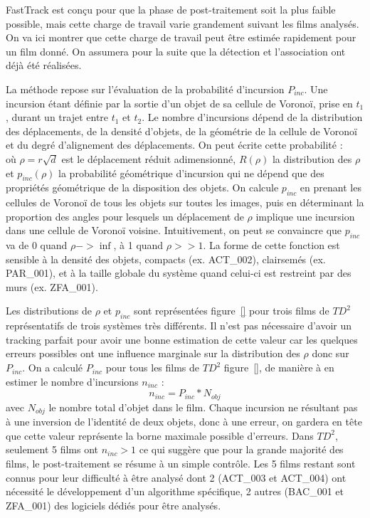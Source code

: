 	FastTrack est conçu pour que la phase de post-traitement soit la plus faible possible, mais cette charge de travail varie grandement suivant les films analysés. On va ici montrer que cette charge de travail peut être estimée rapidement pour un film donné. On assumera pour la suite que la détection et l'association ont déjà été réalisées.
\medbreak
	
	La méthode repose sur l'évaluation de la probabilité d'incursion $P_{inc}$. Une incursion étant définie par la sortie d'un objet de sa cellule de Voronoï, prise en $t_1$, durant un trajet entre $t_1$ et $t_2$. Le nombre d'incursions dépend de la distribution des déplacements, de la densité d'objets, de la géométrie de la cellule de Voronoï et du degré d'alignement des déplacements. On peut écrite cette probabilité :
	$$$$
	où $\rho=r\sqrt{d}$ est le déplacement réduit adimensionné, $R(\rho)$ la distribution des $\rho$ et $p_{inc}(\rho)$ la probabilité géométrique d’incursion qui ne dépend que des propriétés géométrique de la disposition des objets. On calcule $p_{inc}$ en prenant les cellules de Voronoï de tous les objets sur toutes les images, puis en déterminant la proportion des angles pour lesquels un déplacement de $\rho$ implique une incursion dans une cellule de Voronoï voisine. Intuitivement, on peut se convaincre que $p_{inc}$ va de 0 quand $\rho->\inf$, à 1 quand $\rho>>1$. La forme de cette fonction est sensible à la densité des objets, compacts (ex. ACT\_002), clairsemés (ex. PAR\_001), et à la taille globale du système quand celui-ci est restreint par des murs (ex. ZFA\_001).
\medbreak
	
	Les distributions de $\rho$ et $p_{inc}$ sont représentées figure~\ref{} pour trois films de $TD^2$ représentatifs de trois systèmes très différents. Il n'est pas nécessaire d'avoir un tracking parfait pour avoir une bonne estimation de cette valeur car les quelques erreurs possibles ont une influence marginale sur la distribution des $\rho$ donc sur $P_{inc}$.
\medbreak
	On a calculé $P_{inc}$ pour tous les films de $TD^2$ figure~\ref{}, de manière à en estimer le nombre d'incursions $n_{inc}$ :
	$$
	    n_{inc}=P_{inc}*N_{obj}
	$$
	avec $N_{obj}$ le nombre total d'objet dans le film.
	Chaque incursion ne résultant pas à une inversion de l'identité de deux objets, donc à une erreur, on gardera en tête que cette valeur représente la borne maximale possible d'erreurs. Dans $TD^2$, seulement 5 films ont $n_{inc}>1$ ce qui suggère que pour la grande majorité des films, le post-traitement se résume à un simple contrôle. Les 5 films restant sont connus pour leur difficulté à être analysé dont 2 (ACT\_003 et ACT\_004) ont nécessité le développement d'un algorithme spécifique, 2 autres (BAC\_001 et ZFA\_001) des logiciels dédiés pour être analysés.
	
